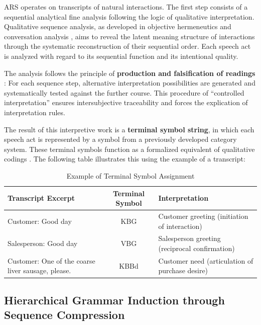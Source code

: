 \documentclass[
  12pt,
  a4paper,
  oneside,
  titlepage
]{article}
\begin{document}
ARS operates on transcripts of natural interactions. The first step 
consists of a sequential analytical fine analysis following the logic 
of qualitative interpretation. Qualitative sequence analysis, as 
developed in objective hermeneutics \citep{Oevermann1979} and 
conversation analysis \citep{Sacks1974}, aims to reveal the latent 
meaning structure of interactions through the systematic reconstruction 
of their sequential order. Each speech act is analyzed with regard to 
its sequential function and its intentional quality.

The analysis follows the principle of \textbf{production and 
falsification of readings} \citep[ p.~392]{Oevermann1979}: For each 
sequence step, alternative interpretation possibilities are generated 
and systematically tested against the further course. This procedure 
of \enquote{controlled interpretation} \citep[ p.~158]{Flick2019} 
ensures intersubjective traceability and forces the explication of 
interpretation rules.

The result of this interpretive work is a \textbf{terminal symbol string}, 
in which each speech act is represented by a symbol from a previously 
developed category system. These terminal symbols function as a 
formalized equivalent of qualitative codings \citep[ p.~207]{Przyborski2021}. 
The following table illustrates this using the example of a transcript:

\begin{table}[h]
\centering
\caption{Example of Terminal Symbol Assignment}
\label{tab:terminal}
\begin{tabular}{@{} p{6cm} c p{4cm} @{}}
\toprule
\textbf{Transcript Excerpt} & \textbf{Terminal Symbol} & \textbf{Interpretation} \\
\midrule
Customer: Good day & KBG & Customer greeting (initiation of interaction) \\
Salesperson: Good day & VBG & Salesperson greeting (reciprocal confirmation) \\
Customer: One of the coarse liver sausage, please. & KBBd & Customer need (articulation of purchase desire) \\
\bottomrule
\end{tabular}
\end{table}

\subsection{Hierarchical Grammar Induction through Sequence Compression}
\end{document}
